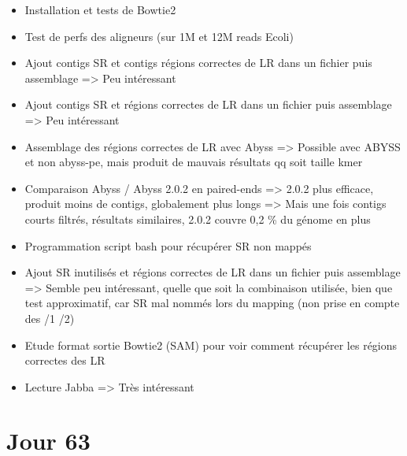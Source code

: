 \documentclass[12pt]{report}
\begin{document}
\begin{itemize}
	\item Installation et tests de Bowtie2
	
	\item Test de perfs des aligneurs (sur 1M et 12M reads Ecoli)	
	
	\item Ajout contigs SR et contigs régions correctes de LR dans un fichier puis assemblage => Peu intéressant
	
	\item Ajout contigs SR et régions correctes de LR dans un fichier puis assemblage => Peu intéressant
	
	\item Assemblage des régions correctes de LR avec Abyss => Possible avec ABYSS et non abyss-pe, mais produit de mauvais résultats qq soit taille kmer
	
	\item Comparaison Abyss / Abyss 2.0.2 en paired-ends => 2.0.2 plus efficace, produit moins de contigs, globalement plus longs
		  => Mais une fois contigs courts filtrés, résultats similaires, 2.0.2 couvre 0,2 \% du génome en plus
	
	\item Programmation script bash pour récupérer SR non mappés
	
	\item Ajout SR inutilisés et régions correctes de LR dans un fichier puis assemblage => Semble peu intéressant, quelle que
		  soit la combinaison utilisée, bien que test approximatif, car SR mal nommés lors du mapping (non prise en compte des /1 /2)
		  
	\item Etude format sortie Bowtie2 (SAM) pour voir comment récupérer les régions correctes des LR
	
	\item Lecture Jabba => Très intéressant
\end{itemize}

\section{Jour 63}
\end{document}
